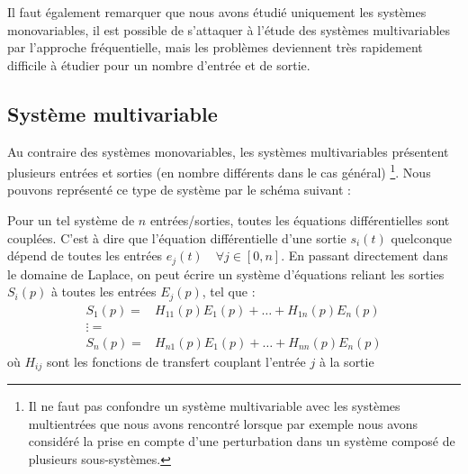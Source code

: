 Il faut également remarquer que nous avons étudié uniquement les systèmes
monovariables, il est possible de s'attaquer à l'étude des systèmes 
multivariables par l'approche fréquentielle, mais les problèmes deviennent
très rapidement difficile à étudier pour un nombre d'entrée et de sortie.   
\subsection{Système multivariable}
Au contraire des systèmes monovariables, les systèmes multivariables présentent
plusieurs entrées et sorties (en nombre différents dans le cas général)
\footnote{Il ne faut pas confondre un système
multivariable avec les systèmes multientrées que nous avons rencontré lorsque
par exemple nous avons considéré la prise en compte d'une perturbation dans
un système composé de plusieurs sous-systèmes.}. Nous pouvons représenté ce 
type de système par le schéma suivant :
\begin{center}
    
\end{center}
Pour un tel système de $n$ entrées/sorties, 
toutes les équations différentielles sont couplées. 
C'est à dire que l'équation différentielle d'une sortie $s_i(t)$ quelconque 
dépend de toutes les entrées $e_j(t)\quad\forall j\in[0,n]$. En passant 
directement dans le domaine de 
Laplace, on peut écrire un système d'équations reliant les sorties $S_i(p)$ 
à toutes les entrées $E_j(p)$, tel que  :
\begin{align*}
    S_1(p) =& H_{11}(p) E_1(p) + \ldots + H_{1n}(p) E_n(p) \\
    \vdots =& \\ 
    S_n(p) =& H_{n1}(p) E_1(p) + \ldots + H_{nn}(p) E_n(p)
\end{align*}
où $H_{ij}$ sont les fonctions de transfert couplant l'entrée $j$ à la sortie 
